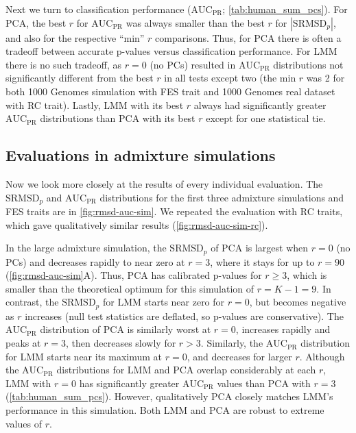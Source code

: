 \documentclass[11pt]{article}
\newcommand{\rmsd}{\text{SRMSD}_p}
\newcommand{\auc}{\text{AUC}_\text{PR}}
\begin{document}
Next we turn to classification performance ($\auc$; \cref{tab:human_sum_pcs}).
For PCA, the best $r$ for $\auc$ was always smaller than the best $r$ for $|\rmsd|$, and also for the respective ``min'' $r$ comparisons.
Thus, for PCA there is often a tradeoff between accurate p-values versus classification performance.
For LMM there is no such tradeoff, as $r=0$ (no PCs) resulted in $\auc$ distributions not significantly different from the best $r$ in all tests except two (the min $r$ was 2 for both 1000 Genomes simulation with FES trait and 1000 Genomes real dataset with RC trait).
Lastly, LMM with its best $r$ always had significantly greater $\auc$ distributions than PCA with its best $r$ except for one statistical tie.

\subsection{Evaluations in admixture simulations}

Now we look more closely at the results of every individual evaluation.
The $\rmsd$ and $\auc$ distributions for the first three admixture simulations and FES traits are in \cref{fig:rmsd-auc-sim}.
We repeated the evaluation with RC traits, which gave qualitatively similar results (\cref{fig:rmsd-auc-sim-rc}).

In the large admixture simulation, the $\rmsd$ of PCA is largest when $r=0$ (no PCs) and decreases rapidly to near zero at $r=3$, where it stays for up to $r=90$ (\cref{fig:rmsd-auc-sim}A).
Thus, PCA has calibrated p-values for $r \ge 3$, which is smaller than the theoretical optimum for this simulation of $r = K - 1 = 9$.
In contrast, the $\rmsd$ for LMM starts near zero for $r=0$, but becomes negative as $r$ increases (null test statistics are deflated, so p-values are conservative).
The $\auc$ distribution of PCA is similarly worst at $r=0$, increases rapidly and peaks at $r = 3$, then decreases slowly for $r > 3$.
Similarly, the $\auc$ distribution for LMM starts near its maximum at $r=0$, and decreases for larger $r$.
Although the $\auc$ distributions for LMM and PCA overlap considerably at each $r$, LMM with $r=0$ has significantly greater $\auc$ values than PCA with $r=3$ (\cref{tab:human_sum_pcs}).
However, qualitatively PCA closely matches LMM's performance in this simulation.
Both LMM and PCA are robust to extreme values of $r$.
\end{document}
